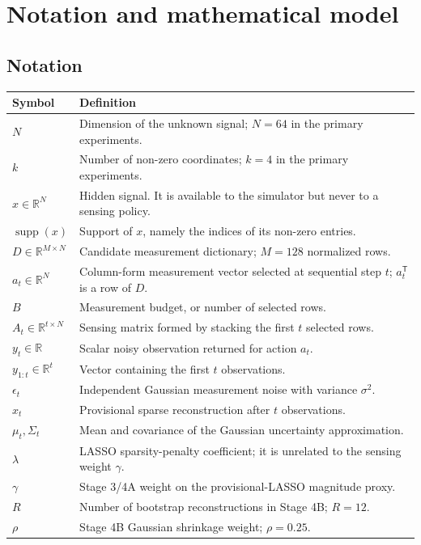 \documentclass[11pt,a4paper]{article}
\newcommand{\R}{\mathbb{R}}
\newcommand{\supp}{\operatorname{supp}}
\newcommand{\trans}{^{\mathsf T}}
\begin{document}
\section{Notation and mathematical model}

\subsection{Notation}

\begin{longtable}{>{\raggedright\arraybackslash}p{}p{}}
\hline
Symbol & Definition \\
\hline
$N$ & Dimension of the unknown signal; $N=64$ in the primary experiments. \\
$k$ & Number of non-zero coordinates; $k=4$ in the primary experiments. \\
$x\in\R^N$ & Hidden signal.  It is available to the simulator but never to a sensing policy. \\
$\supp(x)$ & Support of $x$, namely the indices of its non-zero entries. \\
$D\in\R^{M\times N}$ & Candidate measurement dictionary; $M=128$ normalized rows. \\
$a_t\in\R^N$ & Column-form measurement vector selected at sequential step $t$; $a_t\trans$ is a row of $D$. \\
$B$ & Measurement budget, or number of selected rows. \\
$A_t\in\R^{t\times N}$ & Sensing matrix formed by stacking the first $t$ selected rows. \\
$y_t\in\R$ & Scalar noisy observation returned for action $a_t$. \\
$y_{1:t}\in\R^t$ & Vector containing the first $t$ observations. \\
$\epsilon_t$ & Independent Gaussian measurement noise with variance $\sigma^2$. \\
$\hat{x}_t$ & Provisional sparse reconstruction after $t$ observations. \\
$\mu_t,\Sigma_t$ & Mean and covariance of the Gaussian uncertainty approximation. \\
$\lambda$ & LASSO sparsity-penalty coefficient; it is unrelated to the sensing weight $\gamma$. \\
$\gamma$ & Stage 3/4A weight on the provisional-LASSO magnitude proxy. \\
$R$ & Number of bootstrap reconstructions in Stage 4B; $R=12$. \\
$\rho$ & Stage 4B Gaussian shrinkage weight; $\rho=0.25$. \\
\hline
\end{longtable}
\end{document}
